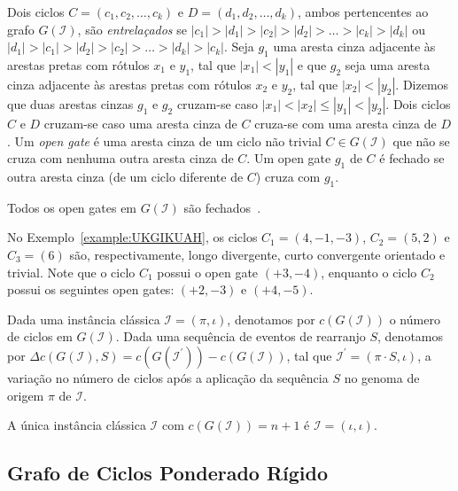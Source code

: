 Dois ciclos $C = (c_1, c_2, \ldots, c_k)$ e $D = (d_1, d_2, \ldots, d_k)$, ambos pertencentes ao grafo $G(\mathcal{I})$, são \emph{entrelaçados} se $|c_1| > |d_1| > |c_2|  > |d_2| > \ldots > |c_k| > |d_k|$ ou $|d_1| > |c_1| > |d_2|  > |c_2| > \ldots > |d_k| > |c_k|$. Seja $g_1$ uma aresta cinza adjacente às arestas pretas com rótulos $x_1$ e $y_1$, tal que $|x_1| < |y_1|$ e que $g_2$ seja uma aresta cinza adjacente às arestas pretas com rótulos $x_2$ e $y_2$, tal que $|x_2| < |y_2|$. Dizemos que duas arestas cinzas $g_1$ e $g_2$ cruzam-se caso $|x_1| < |x_2| \le |y_1| < |y_2|$. Dois ciclos $C$ e $D$ cruzam-se caso uma aresta cinza de $C$ cruza-se com uma aresta cinza de $D$. Um \emph{open gate} é uma aresta cinza de um ciclo não trivial $C \in G(\mathcal{I})$ que não se cruza com nenhuma outra aresta cinza de $C$. Um open gate $g_1$ de $C$ é fechado se outra aresta cinza (de um ciclo diferente de $C$) cruza com $g_1$.

\begin{remark}\label{remark:JBJWNCKF}
Todos os open gates em $G(\mathcal{I})$ são fechados~\cite{1996-bafna-pevzner}.
\end{remark}

No Exemplo~\ref{example:UKGIKUAH}, os ciclos $C_1=(4,-1,-3)$, $C_2 = (5,2)$ e $C_3 = (6)$ são, respectivamente, longo divergente, curto convergente orientado e trivial. Note que o ciclo $C_1$ possui o open gate $({+3},{-4})$, enquanto o ciclo $C_2$ possui os seguintes open gates: $({+2},{-3})$ e $({+4},{-5})$.

Dada uma instância clássica $\mathcal{I} = (\pi,\iota)$, denotamos por $c(G(\mathcal{I}))$ o número de ciclos em $G(\mathcal{I})$. Dada uma sequência de eventos de rearranjo $S$, denotamos por $\Delta c(G(\mathcal{I}), S) = c(G(\mathcal{I^{\prime}})) - c(G(\mathcal{I}))$, tal que $\mathcal{I^{\prime}} = (\pi \cdot S,\iota)$, a variação no número de ciclos após a aplicação da sequência $S$ no genoma de origem $\pi$ de $\mathcal{I}$.

\begin{remark}\label{remark:OYRVGHTB}
  A única instância clássica $\mathcal{I}$ com $c(G(\mathcal{I})) = n + 1$ é $\mathcal{I} = (\iota,\iota)$.
\end{remark}

\subsection{Grafo de Ciclos Ponderado Rígido}\label{subsection:SDWELPAZ}


